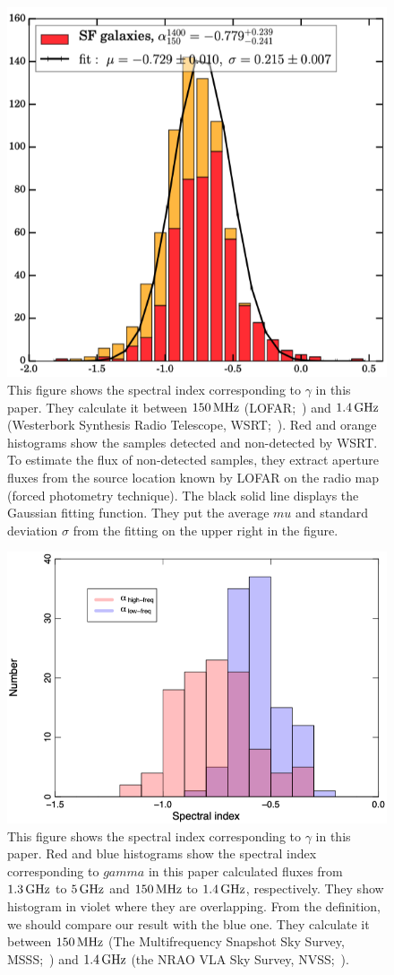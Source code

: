 \begin{figure}[htbp]
	\centering
	\includegraphics[width=.6\linewidth]{Chapter_6/Figures/CalistroRivera2017_Figure7.png}
    \caption[Adapted from \citet{CalistroRivera2017a}]{\label{fig:CalistroRivera2017_figure7}
        This figure shows the spectral index corresponding to $\gamma$ in this paper.
        They calculate it between $150\,\mathrm{MHz}$ (LOFAR;~\citealt{Williams2016}) and $1.4\,\mathrm{GHz}$ (Westerbork Synthesis Radio Telescope, WSRT;~\citealt{DeVries2002}).
        Red and orange histograms show the samples detected and non-detected by WSRT\@.
        To estimate the flux of non-detected samples, they extract aperture fluxes from the source location known by LOFAR on the radio map (forced photometry technique).
        The black solid line displays the Gaussian fitting function.
        They put the average $mu$ and standard deviation $\sigma$ from the fitting on the upper right in the figure.
    }
\end{figure}

\begin{figure}[htbp]
	\centering
	\includegraphics[width=.6\linewidth]{Chapter_6/Figures/Chyzy2018_Figure4.png}
    \caption[Adapted from \citet{Chyzy2018}]{\label{fig:Chyzy2018_figure4}
        This figure shows the spectral index corresponding to $\gamma$ in this paper.
        Red and blue histograms show the spectral index corresponding to $gamma$ in this paper calculated fluxes from $1.3\,\mathrm{GHz}$ to $5\,\mathrm{GHz}$ and $150\,\mathrm{MHz}$ to $1.4\,\mathrm{GHz}$, respectively.
        They show histogram in violet where they are overlapping.
        From the definition, we should compare our result with the blue one.
        They calculate it between $150\,\mathrm{MHz}$ (The Multifrequency Snapshot Sky Survey, MSSS;~\citealt{Heald2015}) and $1.4\,\mathrm{GHz}$ (the NRAO VLA Sky Survey, NVSS;~\citealt{Condon1998}).
    }
\end{figure}

